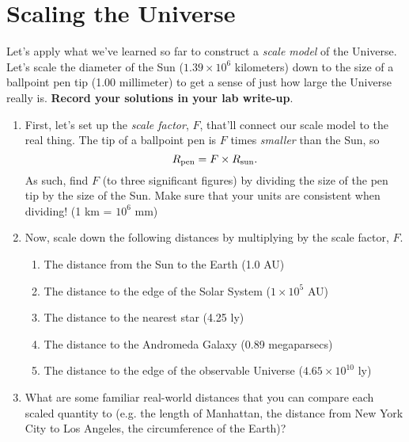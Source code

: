 \documentclass[11pt]{article}
\begin{document}
\section{Scaling the Universe}

Let's apply what we've learned so far to construct a \emph{scale model} of the Universe. Let's scale the diameter of the Sun ($1.39 \times 10^6$ kilometers) down to the size of a ballpoint pen tip (1.00 millimeter) to get a sense of just how large the Universe really is. \textbf{Record your solutions in your lab write-up}.

\begin{enumerate}
    \item First, let's set up the \emph{scale factor}, $F$, that'll connect our scale model to the real thing. The tip of a ballpoint pen is $F$ times \emph{smaller} than the Sun, so $$R_{\rm pen} = F \times R_{\rm sun}.$$ As such, find $F$ (to three significant figures) by dividing the size of the pen tip by the size of the Sun. Make sure that your units are consistent when dividing! (1 km = $10^6$ mm)
    
    \item Now, scale down the following distances by multiplying by the scale factor, $F$.
    \begin{enumerate}
        \item The distance from the Sun to the Earth (1.0 AU) 
        \item The distance to the edge of the Solar System ($1 \times 10^5$ AU)
        \item The distance to the nearest star (4.25 ly)
        \item The distance to the Andromeda Galaxy (0.89 megaparsecs)
        \item The distance to the edge of the observable Universe ($4.65 \times 10^{10}$ ly)
    \end{enumerate}
    
    \item What are some familiar real-world distances that you can compare each scaled quantity to (e.g. the length of Manhattan, the distance from New York City to Los Angeles, the circumference of the Earth)?
\end{enumerate}

\bigskip
\end{document}
